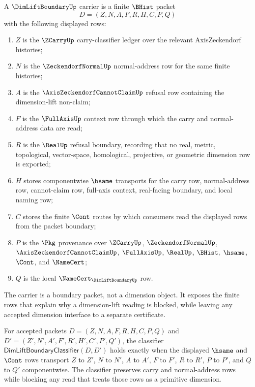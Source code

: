 \begin{definition}
\label{def:dimlift-boundary-carrier}
A $\DimLiftBoundaryUp$ carrier is a finite $\BHist$ packet
$$
D=(Z,N,A,F,R,H,C,P,Q)
$$
with the following displayed rows:
\begin{enumerate}
\item $Z$ is the $\ZCarryUp$ carry-classifier ledger over the relevant AxisZeckendorf histories;
\item $N$ is the $\ZeckendorfNormalUp$ normal-address row for the same finite histories;
\item $A$ is the $\AxisZeckendorfCannotClaimUp$ refusal row containing the dimension-lift non-claim;
\item $F$ is the $\FullAxisUp$ context row through which the carry and normal-address data are read;
\item $R$ is the $\RealUp$ refusal boundary, recording that no real, metric, topological, vector-space, homological, projective, or geometric dimension row is exported;
\item $H$ stores componentwise $\hsame$ transports for the carry row, normal-address row, cannot-claim row, full-axis context, real-facing boundary, and local naming row;
\item $C$ stores the finite $\Cont$ routes by which consumers read the displayed rows from the packet boundary;
\item $P$ is the $\Pkg$ provenance over $\ZCarryUp$, $\ZeckendorfNormalUp$, $\AxisZeckendorfCannotClaimUp$, $\FullAxisUp$, $\RealUp$, $\BHist$, $\hsame$, $\Cont$, and $\NameCert$;
\item $Q$ is the local $\NameCert_{\DimLiftBoundaryUp}$ row.
\end{enumerate}
The carrier is a boundary packet, not a dimension object. It exposes the finite rows that explain why a dimension-lift reading is blocked, while leaving any accepted dimension interface to a separate certificate.
\end{definition}

\begin{definition}
\label{def:dimlift-boundary-classifier}
For accepted packets $D=(Z,N,A,F,R,H,C,P,Q)$ and $D'=(Z',N',A',F',R',H',C',P',Q')$, the classifier $\mathsf{DimLiftBoundaryClassifier}(D,D')$ holds exactly when the displayed $\hsame$ and $\Cont$ rows transport $Z$ to $Z'$, $N$ to $N'$, $A$ to $A'$, $F$ to $F'$, $R$ to $R'$, $P$ to $P'$, and $Q$ to $Q'$ componentwise. The classifier preserves carry and normal-address rows while blocking any read that treats those rows as a primitive dimension.
\end{definition}


